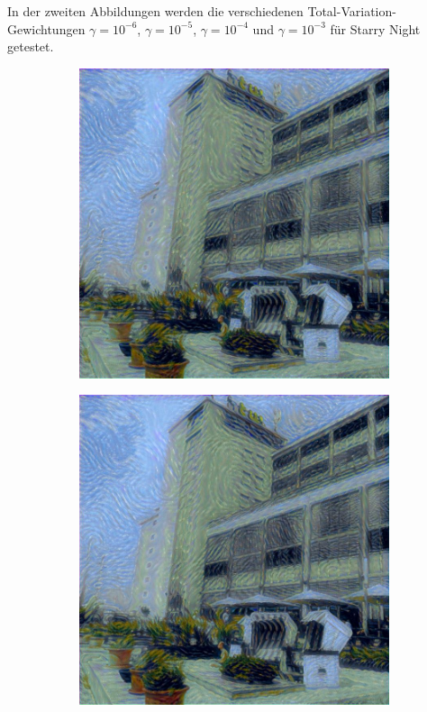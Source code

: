In der zweiten Abbildungen werden die verschiedenen Total-Variation-Gewichtungen $ \gamma = 10^{-6} $, $ \gamma = 10^{-5} $, $ \gamma = 10^{-4} $ und $ \gamma = 10^{-3} $  für Starry Night getestet.

\begin{figure}[H]
    \centering
    \begin{subfigure}[h]{0.24\textwidth}
        \centering
        \includegraphics[width=\textwidth]{resources/content/experiments/b__starry_night__768x768__style-weight_1e+08__tv-weight_1e-06.jpg}
    \end{subfigure}
    \begin{subfigure}[h]{0.24\textwidth}
        \centering
        \includegraphics[width=\textwidth]{resources/content/experiments/b__starry_night__768x768__style-weight_1e+08__tv-weight_1e-05.jpg}

\end{subfigure}
\end{figure}
